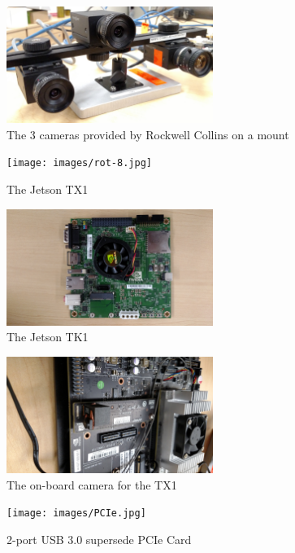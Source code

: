\documentclass[letterpaper,10pt,titlepage]{IEEEtran}
\begin{document}
\begin{figure}[!ht]
  \caption{The 3 cameras provided by Rockwell Collins on a mount}
	  \centering
		    \includegraphics[width=0.6\textwidth]{images/IMG_20160210_131527329.jpg}
				\end{figure}
\begin{figure}[!ht]
  \caption{The Jetson TX1}
	  \centering
		    \texttt{[image: images/rot-8.jpg]}
				\end{figure}
\begin{figure}[!ht]
  \caption{The Jetson TK1}
	  \centering
		    \includegraphics[width=0.6\textwidth]{images/rot-9.jpg}
				\end{figure}
\begin{figure}[!ht]
  \caption{The on-board camera for the TX1 }
	  \centering
		    \includegraphics[width=0.6\textwidth]{images/rot-3.jpg}
				\end{figure}
\begin{figure}[!ht]
  \caption{2-port USB 3.0 supersede PCIe Card}
	  \centering
		    \texttt{[image: images/PCIe.jpg]}
				\end{figure}
\end{document}
